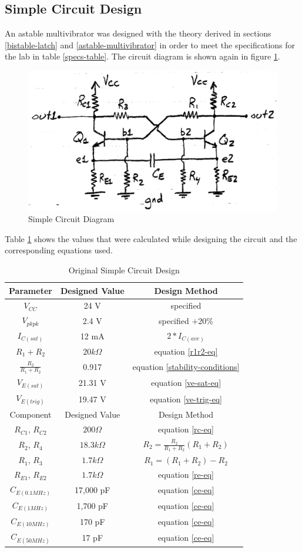 \documentclass[titlepage, letterpaper, 10.5pt]{article}
\begin{document}
\subsection{Simple Circuit Design}

An astable multivibrator was designed with the theory derived in sections
\ref{bistable-latch} and \ref{astable-multivibrator} in order to meet the
specifications for the lab in table \ref{specs-table}.
The circuit diagram is shown again in figure \ref{simple-circuit-2}.

\begin{figure}[ht]
	\centering
	\includegraphics[width=.5\textwidth]{diagrams/simple-circuit}
	\caption{Simple Circuit Diagram}
	\label{simple-circuit-2}
\end{figure}

Table \ref{simple-circuit-design-table} shows the values that were calculated
while designing the circuit and the corresponding equations used.

\begin{table}[ht]
\centering
\caption{Original Simple Circuit Design}
\begin{tabular}{c | c | c}
\hline\hline
Parameter	&Designed Value	&Design Method	\\
\hline\hline
$V_{CC}$	&24 V	&specified	\\
$V_{pkpk}$	&2.4 V	&specified $+20\%$	\\
$I_{C(sat)}$	&12 mA	&$2*I_{C(ave)}$	\\
$R_{1}+R_{2}$	&$20k\Omega$	&equation \ref{r1r2-eq}	\\
$\frac{R_{2}}{R_{1}+R_{2}}$	&0.917	&equation \ref{stability-conditions}	\\
$V_{E(sat)}$	&21.31 V	&equation \ref{ve-sat-eq}	\\
$V_{E(trig)}$	&19.47 V	&equation \ref{ve-trig-eq}	\\
\hline
Component	&Designed Value	&Design Method	\\
\hline
$R_{C1}$, $R_{C2}$	&$200\Omega$	&equation \ref{rc-eq}	\\
$R_{2}$, $R_{4}$	&$18.3k\Omega$	&$R_{2}=\frac{R_{2}}{R_{1}+R_{2}}(R_{1}+R_{2})$	\\
$R_{1}$, $R_{3}$	&$1.7k\Omega$	&$R_{1}=(R_{1}+R_{2})-R_{2}$	\\
$R_{E1}$, $R_{E2}$	&$1.7k\Omega$	&equation \ref{re-eq}	\\
$C_{E(0.1MHz)}$	&17,000 pF	&equation \ref{ce-eq}	\\
$C_{E(1MHz)}$	&1,700 pF	&equation \ref{ce-eq}	\\
$C_{E(10MHz)}$	&170 pF	&equation \ref{ce-eq}	\\
$C_{E(50MHz)}$	&17 pF	&equation \ref{ce-eq}	\\
\hline\hline
\end{tabular}
\label{simple-circuit-design-table}
\end{table}
\end{document}
